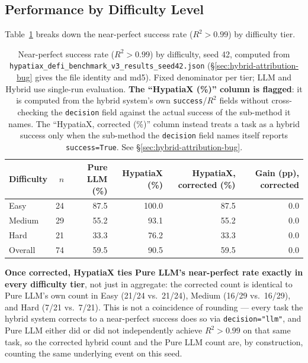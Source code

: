 \documentclass[twoside,11pt]{article}
\newcommand{\Rsq}{R^{2}}
\begin{document}
\subsection{Performance by Difficulty Level}\label{subsec:performance-by-difficulty-level}
\label{sec:difficulty}

Table~\ref{tab:difficulty} breaks down the near-perfect success rate ($\Rsq > 0.99$)
by difficulty tier.

\begin{table}[h]
\centering
\caption{Near-perfect success rate ($\Rsq > 0.99$) by difficulty, seed 42,
computed from \texttt{hypatiax\_defi\_benchmark\_v3\_results\_seed42.json}
(\S\ref{sec:hybrid-attribution-bug} gives the file identity and md5).
Fixed denominator per tier; LLM and Hybrid use single-run evaluation.
\textbf{The ``HypatiaX (\%)'' column is flagged}: it is computed from the
hybrid system's own \texttt{success}/$\Rsq$ fields without cross-checking the
\texttt{decision} field against the actual success of the sub-method it
names. The ``HypatiaX, corrected (\%)'' column instead treats a task as a
hybrid success only when the sub-method the \texttt{decision} field names
itself reports \texttt{success=True}. See \S\ref{sec:hybrid-attribution-bug}.}
\label{tab:difficulty}
\begin{tabular}{lrrrrr}
\toprule
Difficulty & $n$ & Pure LLM (\%) & HypatiaX (\%) & HypatiaX, corrected (\%) & Gain (pp), corrected \\
\midrule
Easy       & 24  & 87.5          & 100.0 & 87.5 & $0.0$ \\
Medium     & 29  & 55.2          & 93.1  & 55.2 & $0.0$ \\
Hard       & 21  & 33.3          & 76.2  & 33.3 & $0.0$ \\
\midrule
Overall    & 74  & 59.5          & 90.5 & 59.5 & $0.0$ \\
\bottomrule
\end{tabular}
\end{table}

\textbf{Once corrected, HypatiaX ties Pure LLM's near-perfect rate exactly in
every difficulty tier}, not just in aggregate: the corrected count is
identical to Pure LLM's own count in Easy (21/24 vs.\ 21/24), Medium (16/29
vs.\ 16/29), and Hard (7/21 vs.\ 7/21). This is not a coincidence of
rounding --- every task the hybrid system corrects to a near-perfect success
does so via \texttt{decision="llm"}, and Pure LLM either did or did not
independently achieve $\Rsq>0.99$ on that same task, so the corrected hybrid
count and the Pure LLM count are, by construction, counting the same
underlying event on this seed. 
\end{document}
